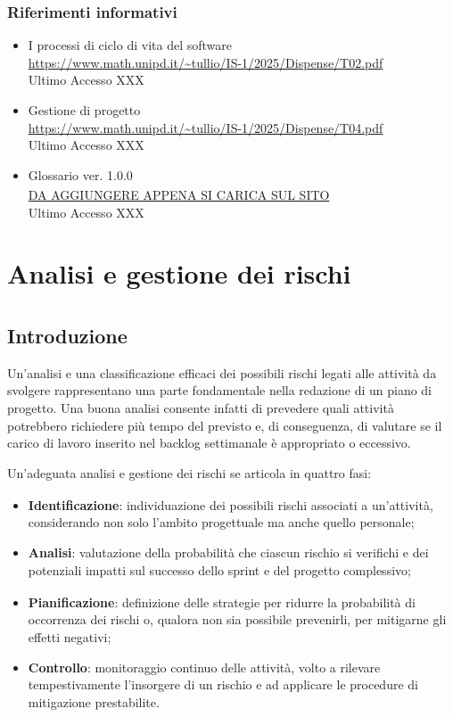\documentclass[a4paper,12pt]{article}
\begin{document}
\subsubsection{Riferimenti informativi}
\begin{itemize}
    \item I processi di ciclo di vita del software \\
    \url{https://www.math.unipd.it/~tullio/IS-1/2025/Dispense/T02.pdf} \\
    Ultimo Accesso XXX
    \item Gestione di progetto \\
    \url{https://www.math.unipd.it/~tullio/IS-1/2025/Dispense/T04.pdf} \\
    Ultimo Accesso XXX
      \item Glossario\textsubscript{} ver. 1.0.0 \\
    \url{DA AGGIUNGERE APPENA SI CARICA SUL SITO} \\
    Ultimo Accesso XXX
\end{itemize}

\newpage

\section{Analisi e gestione dei rischi\textsubscript{}}

\subsection{Introduzione}
Un'analisi e una classificazione efficaci dei possibili rischi legati alle attività da svolgere rappresentano una parte fondamentale nella redazione di un piano di progetto. Una buona analisi consente infatti di prevedere quali attività potrebbero richiedere più tempo del previsto e, di conseguenza, di valutare se il carico di lavoro inserito nel backlog settimanale è appropriato o eccessivo.

Un'adeguata analisi e gestione dei rischi\textsubscript{} se articola in quattro fasi:
\begin{itemize}
\item \textbf{Identificazione}: individuazione dei possibili rischi associati a un'attività, considerando non solo l'ambito progettuale ma anche quello personale;
\item \textbf{Analisi}: valutazione della probabilità che ciascun rischio si verifichi e dei potenziali impatti sul successo dello sprint\textsubscript{} e del progetto complessivo;
\item \textbf{Pianificazione}: definizione delle strategie per ridurre la probabilità di occorrenza dei rischi o, qualora non sia possibile prevenirli, per mitigarne gli effetti negativi;
\item \textbf{Controllo}: monitoraggio continuo delle attività, volto a rilevare tempestivamente l'insorgere di un rischio e ad applicare le procedure di mitigazione prestabilite.
\end{itemize}
\end{document}
